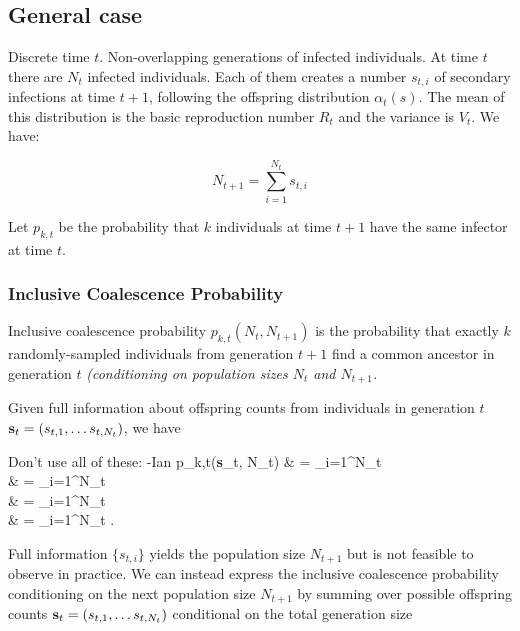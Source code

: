 \documentclass{article}
\let\oldalign\align
\let\oldendalign\endalign
\renewenvironment{align}{\linenomathNonumbers\oldalign}{\oldendalign\endlinenomath}
\begin{document}
\subsection{General case}

Discrete time $t$. Non-overlapping generations of infected individuals. At time $t$ there are $N_t$ infected individuals. Each of them creates a number $s_{t,i}$ of secondary infections at time $t+1$, following the offspring distribution $\alpha_t(s)$. The mean of this distribution is the basic reproduction number $R_t$ and the variance is $V_t$. We have:

\begin{equation}
N_{t+1}=\sum_{i=1}^{N_t} s_{t,i}
\label{eq:summation}
\end{equation}

Let $p_{k,t}$ be the probability that $k$ individuals at time $t+1$ have the same infector at time $t$.

\subsubsection*{Inclusive Coalescence Probability}

Inclusive coalescence probability $p_{k,t}(N_t, N_{t+1})$ is the probability that exactly $k$ randomly-sampled individuals from generation $t+1$ find a common ancestor in generation $t$ {\it (conditioning on population sizes $N_t$ and $N_{t+1}$.}

Given full information about offspring counts from individuals in generation $t$ ${\bf s}_t = (s_{t,1}, \dots s_{t, N_t})$, we have

{\color{red} Don't use all of these: -Ian}
{\allowdisplaybreaks
	\begin{align}
		p_{k,t}({\bf s}_t, N_t)
			& = \sum_{i=1}^{N_t}  \\
			& = \sum_{i=1}^{N_t}   \\
			& = \sum_{i=1}^{N_t}  \\
			& = \sum_{i=1}^{N_t} .
	\end{align}
}

Full information $\{s_{t,i}\}$ yields the population size $N_{t+1}$ but is not feasible to observe in practice.
We can instead express the inclusive coalescence probability conditioning on the next population size $N_{t+1}$ by summing over possible offspring counts ${\bf s}_t = (s_{t,1}, \dots s_{t, N_t})$ conditional on the total generation size
\end{document}
